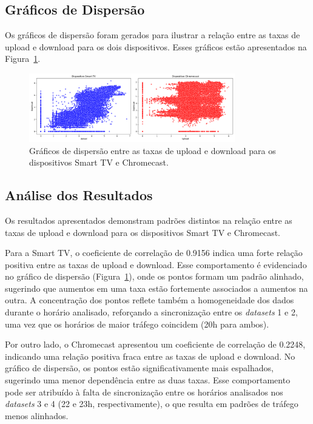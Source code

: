 \subsection{Gráficos de Dispersão}

Os gráficos de dispersão foram gerados para ilustrar a relação entre as taxas de upload e download para os dois dispositivos. Esses gráficos estão apresentados na Figura~\ref{fig:scatter_plot}.

\begin{figure}[H]
    \centering
    \includegraphics[width=0.8\textwidth]{../correlação/scatter_plot.png}
    \caption{Gráficos de dispersão entre as taxas de upload e download para os dispositivos Smart TV e Chromecast.}
    \label{fig:scatter_plot}
\end{figure}

\subsection{Análise dos Resultados}

Os resultados apresentados demonstram padrões distintos na relação entre as taxas de upload e download para os dispositivos Smart TV e Chromecast. 

Para a Smart TV, o coeficiente de correlação de 0.9156 indica uma forte relação positiva entre as taxas de upload e download. Esse comportamento é evidenciado no gráfico de dispersão (Figura~\ref{fig:scatter_plot}), onde os pontos formam um padrão alinhado, sugerindo que aumentos em uma taxa estão fortemente associados a aumentos na outra. A concentração dos pontos reflete também a homogeneidade dos dados durante o horário analisado, reforçando a sincronização entre os \textit{datasets} 1 e 2, uma vez que os horários de maior tráfego coincidem (20h para ambos).

Por outro lado, o Chromecast apresentou um coeficiente de correlação de 0.2248, indicando uma relação positiva fraca entre as taxas de upload e download. No gráfico de dispersão, os pontos estão significativamente mais espalhados, sugerindo uma menor dependência entre as duas taxas. Esse comportamento pode ser atribuído à falta de sincronização entre os horários analisados nos \textit{datasets} 3 e 4 (22 e 23h, respectivamente), o que resulta em padrões de tráfego menos alinhados.





